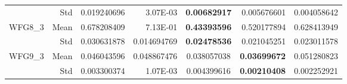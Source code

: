 \begin{table*}[htbp]
\begin{tabular}{rrrrrrr}
          & Std   & 0.019240696 & 3.07E-03 & \multicolumn{1}{c}{\textbf{0.00682917}} & 0.005676601 & 0.004058642 \\
    \multirow{2}[0]{*}{WFG8\_3} & Mean  & 0.678208409 & 7.13E-01 & \multicolumn{1}{c}{\textbf{0.43393596}} & 0.520177894 & 0.628413949 \\
          & Std   & 0.030631878 & 0.014694769 & \multicolumn{1}{c}{\textbf{0.02478536}} & 0.021045251 & 0.023011578 \\
    \multirow{2}[0]{*}{WFG9\_3} & Mean  & 0.046043596 & 0.048867476 & \multicolumn{1}{c}{0.038057038} & \textbf{0.03699672} & 0.051280823 \\
          & Std   & 0.003300374 & 1.07E-03 & \multicolumn{1}{c}{0.004399616} & \textbf{0.00210408} & 0.002252921 \\
    \bottomrule
    \end{tabular}%
  \label{tab:wfg3gd}%
\end{table*}%
